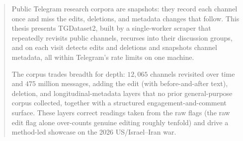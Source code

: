 \begin{abstract}

Public Telegram research corpora are snapshots: they record each channel once and miss the edits, deletions, and metadata changes that follow. This thesis presents TGDataset2, built by a single-worker scraper that repeatedly revisits public channels, recurses into their discussion groups, and on each visit detects edits and deletions and snapshots channel metadata, all within Telegram's rate limits on one machine.

The corpus trades breadth for depth: $12{,}065$ channels revisited over time and $475$ million messages, adding the edit (with before-and-after text), deletion, and longitudinal-metadata layers that no prior general-purpose corpus collected, together with a structured engagement-and-comment surface. These layers correct readings taken from the raw flags (the raw edit flag alone over-counts genuine editing roughly tenfold) and drive a method-led showcase on the 2026 US/Israel--Iran war.

\end{abstract}
